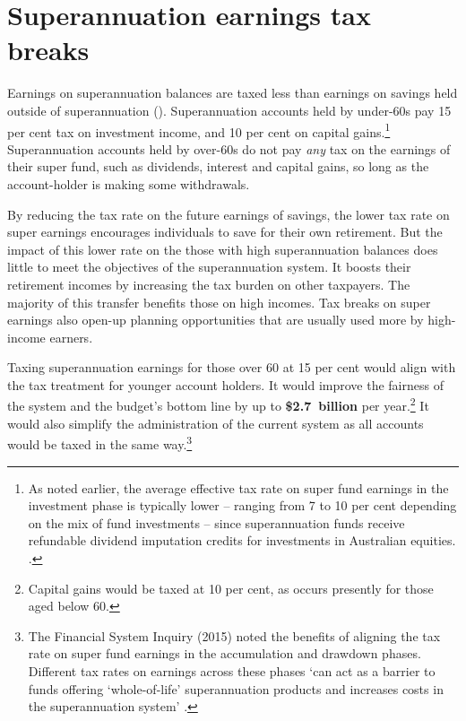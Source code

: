 \chapter{Superannuation earnings tax breaks}\label{chapter:SUPER-6}
Earnings on superannuation balances are taxed less than earnings on savings held outside of superannuation (). Superannuation accounts held by under-60s pay 15 per cent tax on investment income, and 10 per cent on capital gains.\footnote{As noted earlier, the average effective tax rate on super fund earnings in the investment phase is typically lower -- ranging from 7 to 10 per cent depending on the mix of fund investments -- since superannuation funds receive refundable dividend imputation credits for investments in Australian equities.  \textcite[][7]{Mercer2013}.}  Superannuation accounts held by over-60s do not pay \emph{any} tax on the earnings of their super fund, such as dividends, interest and capital gains, so long as the account-holder is making some withdrawals.

By reducing the tax rate on the future earnings of savings, the lower tax rate on super earnings encourages individuals to save for their own retirement. But the impact of this lower rate on the those with high superannuation balances does little to meet the objectives of the superannuation system. It boosts their retirement incomes by increasing the tax burden on other taxpayers. The majority of this transfer benefits those on high incomes. Tax breaks on super earnings also open-up planning opportunities that are usually used more by high-income earners.

Taxing superannuation earnings for those over 60 at 15 per cent would align with the tax treatment for younger account holders. It would improve the fairness of the system and the budget’s bottom line by up to \textbf{\$2.7~billion} per year.\footnote{Capital gains would be taxed at 10 per cent, as occurs presently for those aged below 60.}  It would also simplify the administration of the current system as all accounts would be taxed in the same way.\footnote{The \textcite[][140]{FinancialSystemsInquiry2015} Financial System Inquiry (2015) noted the benefits of aligning the tax rate on super fund earnings in the accumulation and drawdown phases. Different tax rates on earnings across these phases ‘can act as a barrier to funds offering ‘whole-of-life’ superannuation products and increases costs in the superannuation system’ \textcite[][140]{FinancialSystemsInquiry2015}. } 


